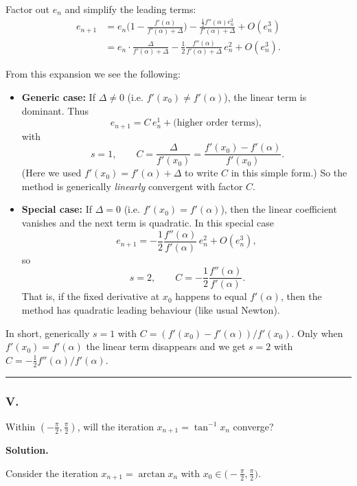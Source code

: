 \documentclass[a4paper]{article}
\begin{document}
Factor out $e_n$ and simplify the leading terms:
\[
\begin{aligned}
e_{n+1}
&= e_n\Big(1-\frac{f'(\alpha)}{f'(\alpha)+\Delta}\Big)
- \frac{\tfrac{1}{2}f''(\alpha)e_n^2}{f'(\alpha)+\Delta} + O(e_n^3)\\[4pt]
&= e_n\cdot\frac{\Delta}{f'(\alpha)+\Delta}
- \frac{1}{2}\frac{f''(\alpha)}{f'(\alpha)+\Delta}\,e_n^2 + O(e_n^3).
\end{aligned}
\]

From this expansion we see the following:

\begin{itemize}
  \item \textbf{Generic case:} If $\Delta \neq 0$ (i.e. $f'(x_0)\neq f'(\alpha)$),
  the linear term is dominant. Thus
  \[
  e_{n+1} = C\, e_n^1 + \text{(higher order terms)},
  \]
  with
  \[
  \boxed{\,s = 1,\qquad
  C = \frac{\Delta}{f'(x_0)} = \frac{f'(x_0)-f'(\alpha)}{f'(x_0)}.}
  \]
  (Here we used $f'(x_0)=f'(\alpha)+\Delta$ to write $C$ in this simple form.)
  So the method is generically \emph{linearly} convergent with factor $C$.
  
  \item \textbf{Special case:} If $\Delta = 0$ (i.e. $f'(x_0)=f'(\alpha)$),
  then the linear coefficient vanishes and the next term is quadratic. In this
  special case
  \[
  e_{n+1} = -\frac{1}{2}\frac{f''(\alpha)}{f'(\alpha)}\,e_n^2 + O(e_n^3),
  \]
  so
  \[
  \boxed{\,s = 2,\qquad
  C = -\frac{1}{2}\frac{f''(\alpha)}{f'(\alpha)}.}
  \]
  That is, if the fixed derivative at $x_0$ happens to equal $f'(\alpha)$,
  then the method has quadratic leading behaviour (like usual Newton).
\end{itemize}

In short, generically \(s=1\) with \(C=(f'(x_0)-f'(\alpha))/f'(x_0)\). Only when
\(f'(x_0)=f'(\alpha)\) the linear term disappears and we get \(s=2\) with
\(C=-\tfrac{1}{2}f''(\alpha)/f'(\alpha)\).




\noindent\rule{\textwidth}{.4pt}

\subsubsection*{V.}
Within $\left(-\frac{\pi}{2}, \frac{\pi}{2}\right)$, will the iteration $x_{n+1} = \tan^{-1} x_n$ converge?

\textbf{Solution.}

Consider the iteration \(x_{n+1}=\arctan x_n\) with \(x_0\in\big(-\tfrac{\pi}{2},\tfrac{\pi}{2}\big)\).
\end{document}
